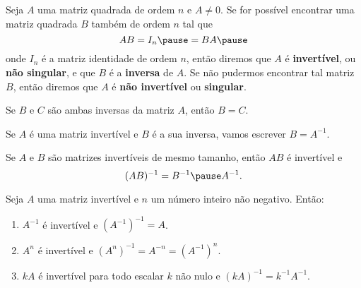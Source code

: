 \documentclass{beamer}
\begin{document}
    \begin{frame}
        \begin{definicao}
            Seja $A$ uma matriz quadrada de ordem $n$ \pause e $A \ne 0$. \pause Se for possível encontrar uma matriz quadrada $B$ \pause também de
            ordem $n$ tal que\pause
            \[
                AB = I_n \pause = BA\pause
            \]
            onde $I_n$ é a matriz identidade de ordem $n$, \pause então diremos que $A$ é \textbf{invertível}, \pause ou \textbf{não singular}, \pause
            e que $B$ é a \textbf{inversa} de $A$. \pause Se não pudermos encontrar tal matriz $B$, \pause então diremos que $A$ é \textbf{não invertível} \pause
            ou \textbf{singular}.
        \end{definicao}
    \end{frame}

    \begin{frame}
        \begin{teorema}
            Se $B$ e $C$ são ambas inversas da matriz $A$, \pause então $B = C$.\pause
        \end{teorema}

        \vspace{1cm}

        \begin{notacao}
            Se $A$ é uma matriz invertível \pause e $B$ é a sua inversa, \pause vamos escrever $B = A^{-1}$.
        \end{notacao}
    \end{frame}

    \begin{frame}
        \begin{proposicao}
            Se $A$ e $B$ são matrizes invertíveis de mesmo tamanho, \pause então $AB$ é invertível \pause e
            \[
                (AB)^{-1} = B^{-1}\pause A^{-1}.
            \]
        \end{proposicao}
    \end{frame}

    \begin{frame}
        \begin{proposicao}
            Seja $A$ uma matriz invertível \pause e $n$ um número inteiro não negativo. \pause Então:\pause
            \begin{enumerate}[label={\roman*})]
                \item $A^{-1}$ é invertível \pause e $(A^{-1})^{-1} = A$.\pause

                \item $A^n$ é invertível \pause e $(A^n)^{-1} = A^{-n} = (A^{-1})^n$.\pause

                \item $kA$ é invertível \pause para todo escalar $k$ não nulo \pause e $(kA)^{-1} = k^{-1}A^{-1}$.
            \end{enumerate}
        \end{proposicao}
    \end{frame}
\end{document}

